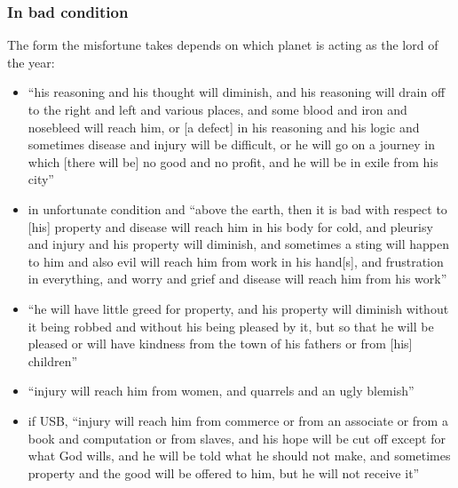 \subsubsection{In bad condition}
The form the misfortune takes depends on which planet is acting as the lord of the year:
\begin{itemize}[topsep=0em,itemsep=0em]
\item[\Mars] ``his reasoning and his thought will diminish, and his reasoning will drain off to the right and left and various places, and some blood and iron and nosebleed will reach him, or [a defect] in his reasoning and his logic and sometimes disease and injury will be difficult, or he will go on a journey in which [there will be] no good and no profit, and he will be in exile from his city''

\item[\Saturn]  in unfortunate condition and ``above the earth, then it is bad with respect to [his] property and disease will reach him in his body for cold, and pleurisy and injury and his property will diminish, and sometimes a sting will happen to him and also evil will reach him from work in his hand[s], and frustration in everything, and worry and grief and disease will reach him from his work''

\item[\Jupiter]  ``he will have little greed for property, and his property will diminish without it being robbed and without his being pleased by it, but so that he will be pleased or will have kindness from the town of his fathers or from [his] children''

\item[\Venus]  ``injury will reach him from women, and quarrels and an ugly blemish''

\item[\Mercury]  if USB, ``injury will reach him from commerce or from an associate or from a book and computation or from slaves, and his hope will be cut off except for what God wills, and he will be told what he should not make, and sometimes property and the good will be offered to him, but he will not receive it''
\end{itemize}

